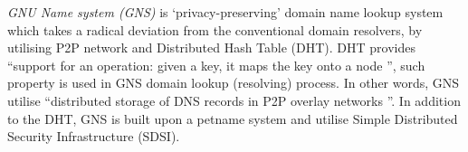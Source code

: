 \textit{GNU Name system (GNS)} \cite{grothoff2017nsa, wachs2014censorship} is `privacy-preserving' domain name lookup system which takes a radical deviation from the conventional domain resolvers, by utilising P2P network and Distributed Hash Table (DHT).
DHT provides ``support for an operation: given a key, it maps the key onto a node \cite{stoica2001chord}'', such property is used in GNS domain lookup (resolving) process. 
In other words, GNS utilise ``distributed storage of DNS records in P2P overlay networks \cite{wachs2014censorship}''. In addition to the DHT, GNS is built upon a petname system \cite{stiegler2005introduction} and utilise Simple Distributed Security Infrastructure (SDSI).